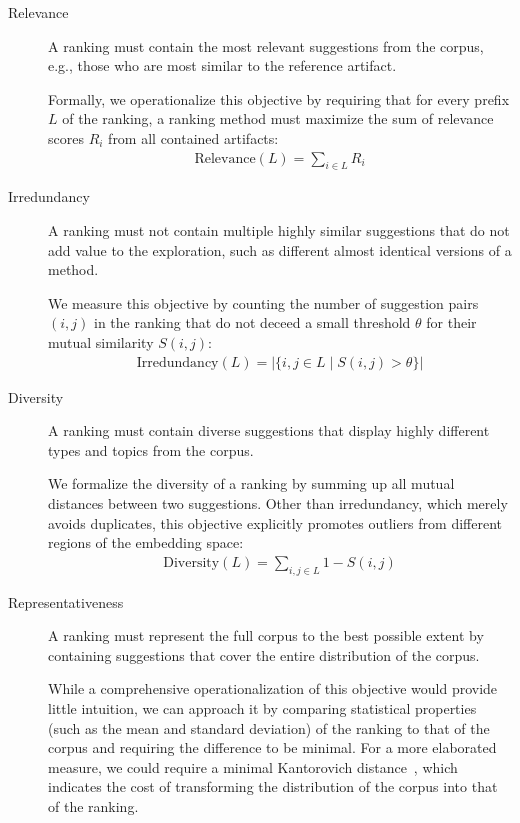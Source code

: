 \begin{description}
	\item[Relevance]
	A ranking must contain the most relevant suggestions from the corpus, e.g., those who are most similar to the reference artifact.

	Formally, we operationalize this objective by requiring that for every prefix $L$ of the ranking, a ranking method must maximize the sum of relevance scores $R_i$ from all contained artifacts:
	\begin{align}
		\text{Relevance}(L) = \sum_{i \in L} R_i
	\end{align}

	\item[Irredundancy]
	A ranking must not contain multiple highly similar suggestions that do not add value to the exploration, such as different almost identical versions of a method.

	We measure this objective by counting the number of suggestion pairs $(i, j)$ in the ranking that do not deceed a small threshold $\theta$ for their mutual similarity $S(i, j)$:
	\begin{align}
		\text{Irredundancy}(L) = | \{ i, j \in L \mid S(i, j) > \theta \} |
	\end{align}

	\item[Diversity]
	A ranking must contain diverse suggestions that display highly different types and topics from the corpus.

	We formalize the diversity of a ranking by summing up all mutual distances between two suggestions.
	Other than irredundancy, which merely avoids duplicates, this objective explicitly promotes outliers from different regions of the embedding space:
	\begin{align}
		\text{Diversity}(L) = \sum_{i, j \in L} 1 - S(i, j)
	\end{align}

	\item[Representativeness]
	A ranking must represent the full corpus to the best possible extent by containing suggestions that cover the entire distribution of the corpus.

	While a comprehensive operationalization of this objective would provide little intuition, we can approach it by comparing statistical properties (such as the mean and standard deviation) of the ranking to that of the corpus and requiring the difference to be minimal.
	For a more elaborated measure, we could require a minimal Kantorovich distance~\cite{vaserstein1969markov}, which indicates the cost of transforming the distribution of the corpus into that of the ranking.
\end{description}

